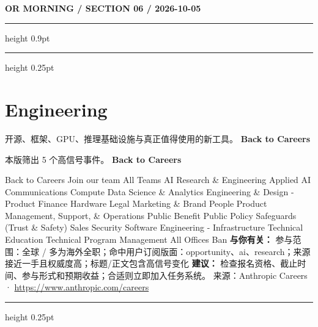 \documentclass[10.5pt]{ctexart}
\begin{document}
\newpage
{\small\bfseries OR MORNING / SECTION 06 / 2026-10-05}
\vspace{2mm}
\hrule height 0.9pt
\vspace{1.5mm}
\hrule height 0.25pt
\vspace{4mm}
\section*{Engineering}
{\color{ormuted} 开源、框架、GPU、推理基础设施与真正值得使用的新工具。}
\vspace{2mm}
{\LARGE\bfseries Back to Careers}\par
\vspace{1mm}
{\color{ormuted} 本版筛出 5 个高信号事件。}
\vspace{3mm}
{\Large\bfseries Back to Careers}\par
Back to Careers Join our team All Teams AI Research \& Engineering Applied AI Communications Compute Data Science \& Analytics Engineering \& Design - Product Finance Hardware Legal Marketing \& Brand People Product Management, Support, \& Operations Public Benefit Public Policy Safeguards (Trust \& Safety) Sales Security Software Engineering - Infrastructure Technical Education Technical Program Management All Offices Ban
\textbf{与你有关：} 参与范围：全球 / 多为海外全职；命中用户订阅版面：opportunity、ai、research；来源接近一手且权威度高；标题/正文包含高信号变化
\textbf{建议：} 检查报名资格、截止时间、参与形式和预期收益；合适则立即加入任务系统。
{\footnotesize\color{ormuted} 来源：Anthropic Careers · \url{https://www.anthropic.com/careers}}
\vspace{4mm}
\hrule height 0.25pt
\vspace{3mm}
\end{document}
